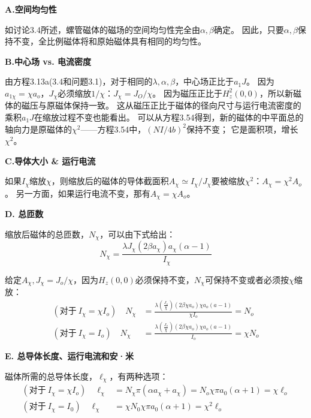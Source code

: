 \textbf{A.空间均匀性}

如讨论3.4所述，螺管磁体的磁场的空间均匀性完全由$\alpha,\beta$确定。
因此，只要$\alpha,\beta$保持不变，全比例磁体将和原始磁体具有相同的均匀性。

\textbf{B.中心场 vs. 电流密度}

由方程3.13a(3.4和问题3.1)，对于相同的$\lambda,\alpha,\beta$，中心场正比于$a_1 J$。
因为$a_{1\chi}=\chi a_o$，$J_\chi$必须缩放$1/\chi$：$J_\chi=J_O/\chi$。
因为磁压正比于$H_z^2(0, 0)$，所以新磁体的磁压与原磁体保持一致。
这从磁压正比于磁体的径向尺寸与运行电流密度的乘积$a_1 J$在缩放过程不变也能看出。
可以从方程3.54得到，新的磁体的中平面总的轴向力是原磁体的$\chi^2$——方程3.54中，$(NI/4b)^2$保持不变；
它是面积项，增长$\chi^2$。

\textbf{C.导体大小 \& 运行电流}

如果$I_\chi$缩放$\chi$，则缩放后的磁体的导体截面积$A_\chi\simeq I_\chi/J_\chi$要被缩放$\chi^2$：$A_\chi=\chi^2 A_o$。
另一方面，如果运行电流不变，那有$A_\chi=\chi A_o$。

\textbf{D. 总匝数}

缩放后磁体的总匝数，$N_\chi$，可以由下式给出：
\begin{equation}
N_{\chi}=\frac{\lambda J_{\chi}(2\beta a_{\chi})a_{\chi}(\alpha-1)}{I_{\chi}}%
\end{equation}

给定$A_\chi,J_\chi =J_o/\chi$，因为$H_z(0,0)$必须保持不变，$N_\chi$可保持不变或者必须按$\chi$缩放：
\begin{align*}
(\mbox{对于}\ I_{\chi}=\chi I_{o})\quad N_{\chi}&=\frac{\lambda(\frac{J_{o}}{\chi})(2\beta\chi a_{o})\chi a_{o}(a-1)}{\chi I_{o}}=N_{o}\tag{3.168b}\\
(\mbox{对于}\ I_{\chi}=I_{o})\quad  N_{\chi}&=\frac{\lambda(\frac{J_{o}}{\chi})(2\beta\chi a_{o})\chi a_{o}(a-1)}{I_{o}}=\chi N_{o}\tag{3.168c}%
\end{align*}

\textbf{E. 总导体长度、运行电流和安·米}

磁体所需的总导体长度，$\ell_\chi$，有两种选项：
\begin{subequations}
	\begin{align}
(\mbox{对于}\ I_{\chi}=\chi I_{o})\quad \ell_{\chi}&=N_{\chi} \pi (\alpha a_\chi+a_\chi)=N_{o}\chi \pi a_0(\alpha+1)=\chi \ell_{o}\\%
(\mbox{对于}\ I_{\chi}=I_0)\quad \ell_{\chi}&=\chi N_0 \chi \pi a_0 (\alpha+1)=\chi^2 \ell_{o}%
	\end{align}
\end{subequations}


